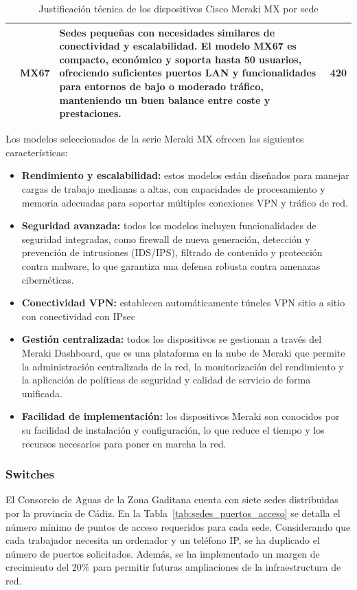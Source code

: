 \begin{table}[H]
{\begin{scriptsize}
\begin{tabular}{|c|c|p{6cm}|c|}
				                & \multirow{5}{*}{MX67}     & Sedes pequeñas con necesidades similares de conectividad y escalabilidad. El modelo MX67 es compacto, económico y soporta hasta 50 usuarios, ofreciendo suficientes puertos LAN y funcionalidades para entornos de bajo o moderado tráfico, manteniendo un buen balance entre coste y prestaciones. & \multirow{5}{*}{420}         \\ \hline
			\end{tabular}
		\end{scriptsize}
	}
	\caption{Justificación técnica de los dispositivos Cisco Meraki MX por sede}
	\label{tab:justificacion_meraki}
\end{table}

\noindent
Los modelos seleccionados de la serie Meraki MX  ofrecen las siguientes características:
\begin{itemize}
	\item \textbf{Rendimiento y escalabilidad:} estos modelos están diseñados para manejar cargas de trabajo medianas a altas, con capacidades de procesamiento y memoria adecuadas para soportar múltiples conexiones VPN y tráfico de red.
	\item \textbf{Seguridad avanzada:} todos los modelos incluyen funcionalidades de seguridad integradas, como firewall de nueva generación, detección y prevención de intrusiones (IDS/IPS), filtrado de contenido y protección contra malware, lo que garantiza una defensa robusta contra amenazas cibernéticas.
	\item \textbf{Conectividad VPN:} establecen automáticamente túneles VPN sitio a sitio con conectividad con IPsec
	\item \textbf{Gestión centralizada:} todos los dispositivos se gestionan a través del Meraki Dashboard, que es una plataforma en la nube de Meraki que permite la administración centralizada de la red, la monitorización del rendimiento y la aplicación de políticas de seguridad y calidad de servicio de forma unificada.
	\item \textbf{Facilidad de implementación:} los dispositivos Meraki son conocidos por su facilidad de instalación y configuración, lo que reduce el tiempo y los recursos necesarios para poner en marcha la red.
\end{itemize}

\subsubsection{Switches}
El Consorcio de Aguas de la Zona Gaditana cuenta con siete sedes distribuidas por la provincia de Cádiz.
En la Tabla~\ref{tab:sedes_puertos_acceso} se detalla el número mínimo de puntos de acceso requeridos
para cada sede. Considerando que cada trabajador necesita un ordenador y un teléfono IP, se ha
duplicado el número de puertos solicitados. Además, se ha implementado un margen de crecimiento
del 20\% para permitir futuras ampliaciones de la infraestructura de red.

